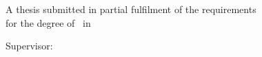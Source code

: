 \begin{titlepage}
  \centering
  {\large\thesisuniversity\par}
  {\large\thesisdepartment\par}
  {\LARGE\bfseries\thesistitle\par}
  \vspace{2\baselineskip}
  {\Large\thesisauthor\par}
  A thesis submitted in partial fulfilment of the requirements\\
  for the degree of \thesisdegree\ in \thesisprogramme\par
  \vspace{2\baselineskip}
  Supervisor: \thesissupervisor\par
  {\large\thesisdate\par}
\end{titlepage}
